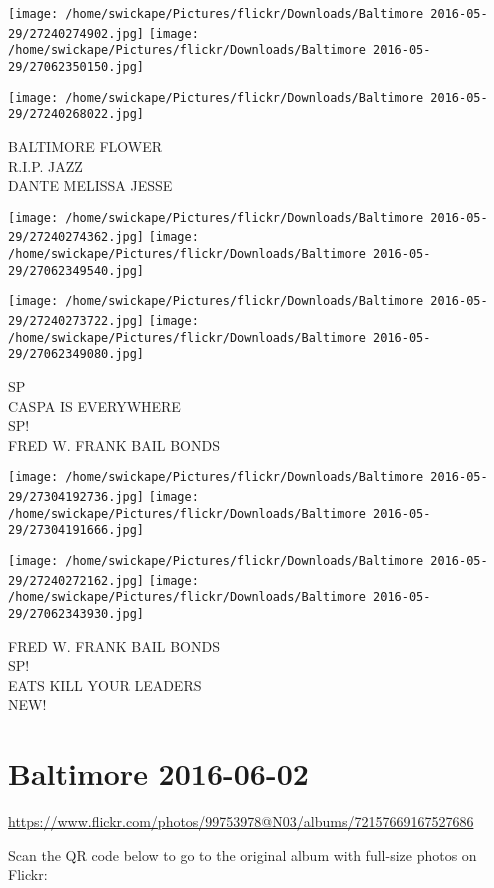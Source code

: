 \documentclass[10pt,letterpaper]{article}
\begin{document}
\texttt{[image: /home/swickape/Pictures/flickr/Downloads/Baltimore 2016-05-29/27240274902.jpg]}
\texttt{[image: /home/swickape/Pictures/flickr/Downloads/Baltimore 2016-05-29/27062350150.jpg]}

\vspace{0.25in}
\texttt{[image: /home/swickape/Pictures/flickr/Downloads/Baltimore 2016-05-29/27240268022.jpg]}

BALTIMORE FLOWER\\
R.I.P. JAZZ\\
DANTE MELISSA JESSE
\pagebreak

\texttt{[image: /home/swickape/Pictures/flickr/Downloads/Baltimore 2016-05-29/27240274362.jpg]}
\texttt{[image: /home/swickape/Pictures/flickr/Downloads/Baltimore 2016-05-29/27062349540.jpg]}

\texttt{[image: /home/swickape/Pictures/flickr/Downloads/Baltimore 2016-05-29/27240273722.jpg]}
\texttt{[image: /home/swickape/Pictures/flickr/Downloads/Baltimore 2016-05-29/27062349080.jpg]}

SP\\
CASPA IS EVERYWHERE\\
SP!\\
FRED W. FRANK BAIL BONDS
\pagebreak

\texttt{[image: /home/swickape/Pictures/flickr/Downloads/Baltimore 2016-05-29/27304192736.jpg]}
\texttt{[image: /home/swickape/Pictures/flickr/Downloads/Baltimore 2016-05-29/27304191666.jpg]}

\texttt{[image: /home/swickape/Pictures/flickr/Downloads/Baltimore 2016-05-29/27240272162.jpg]}
\texttt{[image: /home/swickape/Pictures/flickr/Downloads/Baltimore 2016-05-29/27062343930.jpg]}

FRED W. FRANK BAIL BONDS\\
SP!\\
EATS KILL YOUR LEADERS\\
NEW!
\pagebreak

\section*{Baltimore 2016-06-02}

\url{https://www.flickr.com/photos/99753978@N03/albums/72157669167527686}

Scan the QR code below to go to the original album with full-size photos on Flickr:
\end{document}
